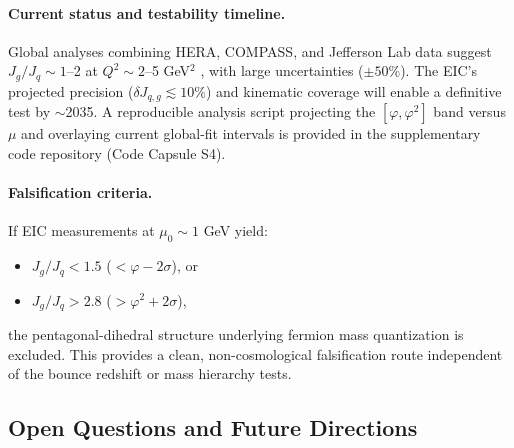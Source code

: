 \documentclass[12pt]{article}
\begin{document}
\paragraph{Current status and testability timeline.} Global analyses combining HERA, COMPASS, and Jefferson Lab data suggest $J_g/J_q \sim 1$--2 at $Q^2 \sim 2$--5 GeV$^2$ \cite{star2021gluon}, with large uncertainties ($\pm 50\%$). The EIC's projected precision ($\delta J_{q,g} \lesssim 10\%$) and kinematic coverage will enable a definitive test by $\sim$2035. A reproducible analysis script projecting the $[\varphi, \varphi^2]$ band versus $\mu$ and overlaying current global-fit intervals is provided in the supplementary code repository (Code Capsule S4).

\paragraph{Falsification criteria.} If EIC measurements at $\mu_0 \sim 1$ GeV yield:
\begin{itemize}
\item $J_g/J_q < 1.5$ ($< \varphi - 2\sigma$), or
\item $J_g/J_q > 2.8$ ($> \varphi^2 + 2\sigma$),
\end{itemize}
the pentagonal-dihedral structure underlying fermion mass quantization is excluded. This provides a clean, non-cosmological falsification route independent of the bounce redshift or mass hierarchy tests.

\subsection{Open Questions and Future Directions}
\end{document}

